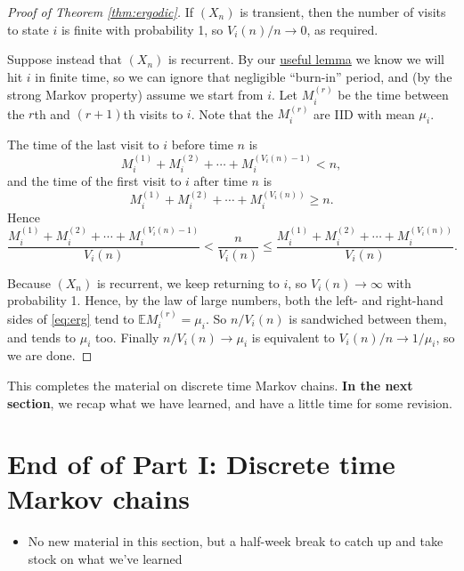 \documentclass[
  a4paper,
]{article}
\providecommand{\tightlist}{%
  \setlength{\itemsep}{0pt}\setlength{\parskip}{0pt}}
\theoremstyle{definition}
\theoremstyle{definition}
\theoremstyle{definition}
\theoremstyle{remark}
\begin{document}
\begin{proof}[Proof of Theorem \ref{thm:ergodic}]

If \((X_n)\) is transient, then the number of visits to state \(i\) is finite with probability 1, so \(V_i(n)/n \to 0\), as required.

Suppose instead that \((X_n)\) is recurrent. By our \protect\hyperlink{S09-lemma}{useful lemma} we know we will hit \(i\) in finite time, so we can ignore that negligible ``burn-in'' period, and (by the strong Markov property) assume we start from \(i\). Let \(M_{i}^{(r)}\) be the time between the \(r\)th and \((r+1)\)th visits to \(i\). Note that the \(M_{i}^{(r)}\) are IID with mean \(\mu_i\).

The time of the last visit to \(i\) before time \(n\) is
\[ M_{i}^{(1)} + M_{i}^{(2)} + \cdots + M_{i}^{(V_i(n)-1)} < n ,\]
and the time of the first visit to \(i\) after time \(n\) is
\[ M_{i}^{(1)} + M_{i}^{(2)} + \cdots + M_{i}^{(V_i(n))} \geq n .\]
Hence
\begin{equation}
\frac{M_{i}^{(1)} + M_{i}^{(2)} + \cdots + M_{i}^{(V_i(n)-1)}}{V_i(n)} < \frac{n}{V_i(n)} \leq \frac{M_{i}^{(1)} + M_{i}^{(2)} + \cdots + M_{i}^{(V_i(n))}}{V_i(n)} . \label{eq:erg}
\end{equation}

Because \((X_n)\) is recurrent, we keep returning to \(i\), so \(V_i(n) \to \infty\) with probability 1. Hence, by the law of large numbers, both the left- and right-hand sides of \eqref{eq:erg} tend to \(\mathbb E M_{i}^{(r)} = \mu_i\). So \(n/V_i(n)\) is sandwiched between them, and tends to \(\mu_i\) too. Finally \(n/V_i(n) \to \mu_i\) is equivalent to \(V_i(n)/n \to 1/\mu_i\), so we are done.

\end{proof}

This completes the material on discrete time Markov chains. \textbf{In the next section}, we recap what we have learned, and have a little time for some revision.

\hypertarget{S12-revision-i}{%
\section{End of of Part I: Discrete time Markov chains}\label{S12-revision-i}}

\begin{itemize}
\tightlist
\item
  No new material in this section, but a half-week break to catch up and take stock on what we've learned
\end{itemize}
\end{document}
